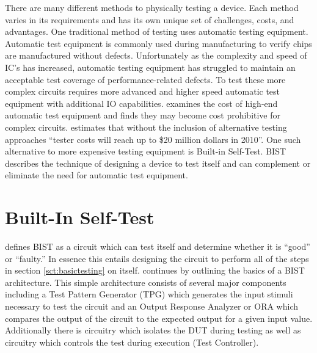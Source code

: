 \documentclass[12pt]{report}
\begin{document}
There are many different methods to physically testing a device.  Each method varies in its requirements and has its own unique set of challenges, costs, and advantages.  One traditional method of testing uses automatic testing equipment.  Automatic test equipment is commonly used during manufacturing to verify chips are manufactured without defects\cite{zorian}.  Unfortunately as the complexity and speed of IC's has increased, automatic testing equipment has struggled to maintain an acceptable test coverage of performance-related defects\cite{zorian}.  To test these more complex circuits requires more advanced and higher speed automatic test equipment with additional IO capabilities\cite{zorian}.  \cite{zorian} examines the cost of high-end automatic test equipment and finds they may become cost prohibitive for complex circuits.  \cite{itrs} estimates that without the inclusion of alternative testing approaches ``tester costs will reach up to \$20 million dollars in 2010''. One such alternative to more expensive testing equipment is Built-in Self-Test. BIST describes the technique of designing a device to test itself\cite{stroud} and can complement or eliminate the need for automatic test equipment\cite{zorian}.

\section{Built-In Self-Test}
\cite{stroud} defines BIST as a circuit which can test itself and determine whether it is ``good'' or ``faulty.''  In essence this entails designing the circuit to perform all of the steps in section \ref{sct:basictesting} on itself.  \cite{stroud} continues by outlining the basics of a BIST architecture.  This simple architecture consists of several major components including a Test Pattern Generator (TPG) which generates the input stimuli necessary to test the circuit and an Output Response Analyzer or ORA which compares the output of the circuit to the expected output for a given input value.  Additionally there is circuitry which isolates the DUT during testing as well as circuitry which controls the test during execution (Test Controller)\cite{stroud}.
\end{document}
